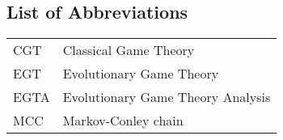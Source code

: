\subsection*{List of Abbreviations}

\begin{longtable}[l]{ll}
    CGT  & Classical Game Theory \\
    EGT  & Evolutionary Game Theory \\
    EGTA & Evolutionary Game Theory Analysis \\
    MCC  & Markov-Conley chain \\
\end{longtable}